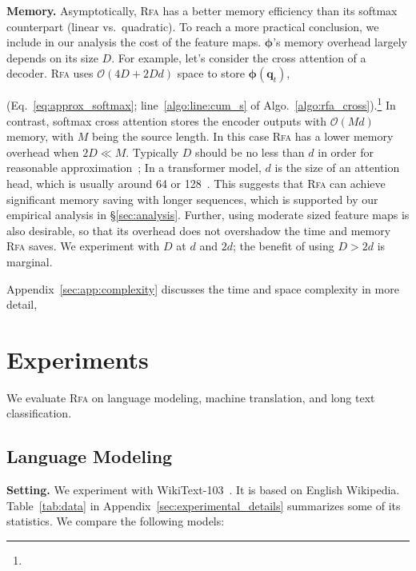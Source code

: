\textbf{Memory.}
Asymptotically, \textsc{Rfa} has a better memory efficiency than its softmax counterpart (linear vs.~quadratic). To reach a more practical conclusion, we include in our analysis the cost of the feature maps.  
$\boldsymbol{\phi}$'s memory overhead largely depends on its size $D$. For example, let's consider the cross attention of a decoder.
\textsc{Rfa} uses ${\mathcal{O}}(4D + 2Dd)$ space to store 
$\boldsymbol{\phi}({\mathbf{q}}_t)$,

({Eq.~\ref{eq:approx_softmax}}; line~\ref{algo:line:cum_s} of Algo.~\ref{algo:rfa_cross}).\footnote{

} In contrast, softmax cross attention stores the encoder outputs with  
${\mathcal{O}}(Md)$ memory, with $M$ being the source length. In this case \textsc{Rfa} has a lower memory overhead when $2D \ll M$. Typically $D$ should be no less than $d$ in order for reasonable approximation~\citep{yu2016orf}; In a transformer model, $d$ is the size of an attention head, which is usually around 64 or 128~\citep{vaswani2017attention,ott2018scaling}. This  suggests that 
\textsc{Rfa} can achieve significant memory saving with longer sequences, which is supported by our empirical analysis in \S\ref{sec:analysis}.
Further, using moderate sized feature maps is also desirable, so that its overhead does not overshadow the time and memory \textsc{Rfa} saves. We experiment with $D$ at $d$ and $2d$; the benefit of using $D>2d$ is marginal.

Appendix~\ref{sec:app:complexity}
discusses the time and space complexity in more detail,

\section{Experiments}\label{sec:experiments}
We evaluate \textsc{Rfa} on language modeling, machine translation, {and long text classification}.

\subsection{Language Modeling}\label{sec:lm}

\textbf{Setting.}
We experiment with WikiText-103~\citep{merity2016pointer}. It is based on  English Wikipedia.
Table~\ref{tab:data} in Appendix~\ref{sec:experimental_details} summarizes some of its statistics. We compare the following models:

